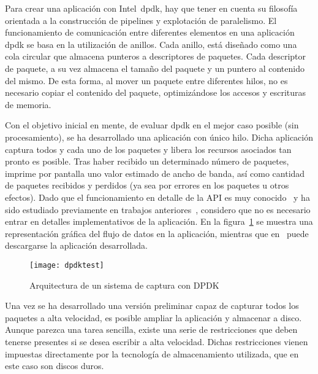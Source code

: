 
Para crear una aplicación con Intel~\gls{dpdk}, hay que tener en cuenta su filosofía orientada a la construcción de pipelines y explotación de paralelismo. El funcionamiento de comunicación entre diferentes elementos en una aplicación \gls{dpdk} se basa en la utilización de anillos. Cada anillo, está diseñado como una cola circular que almacena punteros a descriptores de paquetes. Cada descriptor de paquete, a su vez almacena el tamaño del paquete y un puntero al contenido del mismo. De esta forma, al mover un paquete entre diferentes hilos, no es necesario copiar el contenido del paquete, optimizándose los accesos y escrituras de memoria.

Con el objetivo inicial en mente, de evaluar \gls{dpdk} en el mejor caso posible (sin procesamiento), se ha desarrollado una aplicación con único hilo. Dicha aplicación captura todos y cada uno de los paquetes y libera los recursos asociados tan pronto es posible. Tras haber recibido un determinado número de paquetes, imprime por pantalla uno valor estimado de ancho de banda, así como cantidad de paquetes recibidos y perdidos (ya sea por errores en los paquetes u otros efectos). Dado que el funcionamiento en detalle de la API es muy conocido~\cite{dpdk2015} y ha sido estudiado previamente en trabajos anteriores~\cite{rleira2013TFG,dpdk:Leir1306}, considero que no es necesario entrar en detalles implementativos de la aplicación. En la figura~\ref{fig:dis:dpdktest} se muestra una representación gráfica del flujo de datos en la aplicación, mientras que en~\cite{dpdkspeedometer} puede descargarse la aplicación desarrollada.

\begin{figure}[!th]
\centering
\texttt{[image: dpdktest]}
\caption{Arquitectura de un sistema de captura con DPDK}
\label{fig:dis:dpdktest}
\end{figure}

Una vez se ha desarrollado una versión preliminar capaz de capturar todos los paquetes a alta velocidad, es posible ampliar la aplicación y almacenar a disco. Aunque parezca una tarea sencilla, existe una serie de restricciones que deben tenerse presentes si se desea escribir a alta velocidad. Dichas restricciones vienen impuestas directamente por la tecnología de almacenamiento utilizada, que en este caso son discos duros.

